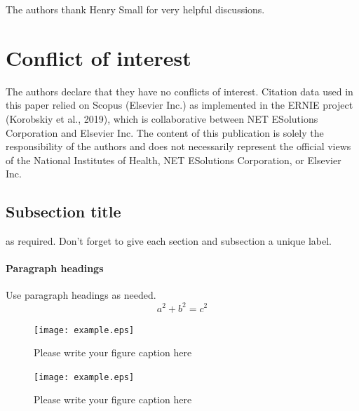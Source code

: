 \begin{acknowledgements} The authors thank Henry Small for very helpful discussions.
\end{acknowledgements}

%
 \section*{Conflict of interest}
The authors declare that they have no conflicts of interest. Citation data used in this paper relied on Scopus (Elsevier Inc.) as implemented in the ERNIE project (Korobskiy et al., 2019), which is collaborative between NET ESolutions Corporation and Elsevier Inc. The content of this publication is solely the responsibility of the authors and does not necessarily represent the official views of the National Institutes of Health, NET ESolutions Corporation, or Elsevier Inc.








\subsection{Subsection title}
\label{sec:2}
as required. Don't forget to give each section
and subsection a unique label.
\paragraph{Paragraph headings} Use paragraph headings as needed.
\begin{equation}
a^2+b^2=c^2
\end{equation}

\begin{figure}
  \texttt{[image: example.eps]}
\caption{Please write your figure caption here}
\label{fig:1}       %
\end{figure}
%
\begin{figure}
  \texttt{[image: example.eps]}
\caption{Please write your figure caption here}
\label{fig:2}       %
\end{figure}

